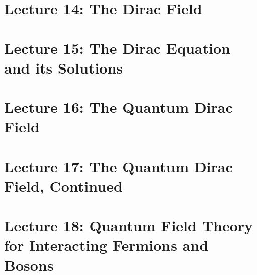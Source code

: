 \documentclass[10pt]{article}
\begin{document}
 

\clearpage

\section{Lecture 14: The Dirac Field}
\label{sec:lec14}

 

\clearpage

\section{Lecture 15: The Dirac Equation and its Solutions}
\label{sec:lec15}

 

\clearpage

\section{Lecture 16: The Quantum Dirac Field}
\label{sec:lec16}

 

\clearpage

\section{Lecture 17: The Quantum Dirac Field, Continued}
\label{sec:lec17}

 

\clearpage

\section{Lecture 18: Quantum Field Theory for Interacting Fermions and Bosons}
\label{sec:lec18}

 

\clearpage
\end{document}
